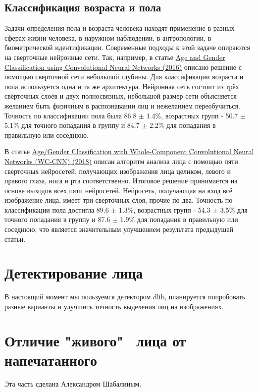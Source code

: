 \documentclass[a4paper,14pt]{extarticle}
\newcommand{\bibref}[3]{\hyperlink{#1}{#2 (#3)}} %
\begin{document}
    \subsection{Классификация возраста и пола}
    \par Задачи определения пола и возраста человека находят применение в разных сферах жизни человека, в наружном наблюдении, в антропологии, в биометрической идентификации. Современные подходы к этой задаче опираются на сверточные нейронные сети. Так, например, в статье \bibref{hassner}{Age and Gender Classification using Convolutional Neural Networks}{2016} описано решение с помощью сверточной сети небольшой глубины. Для классификации возраста и пола используется одна и та же архитектура. Нейронная сеть состоит из трёх свёрточных слоёв и двух полносвязных, небольшой размер сети объясняется желанием быть физичным в распознавании лиц и нежеланием переобучиться. Точность по классификации пола была 86.8 $\pm$ 1.4\%, возрастных групп - 50.7 $\pm$ 5.1\% для точного попадания в группу и 84.7 $\pm$ 2.2\% для попадания в правильную или соседнюю.
    \par В статье \bibref{INDIA}{Age/Gender Classification with Whole-Component Convolutional Neural Networks (WC-CNN)}{2018} описан алгоритм анализа лица с помощью пяти сверточных нейросетей, получающих изображения лица целиком, левого и правого глаза, носа и рта соответственно. Итоговое решение принимается на основе выходов всех пяти нейросетей. Нейросеть, получающая на вход всё изображение лица, имеет три сверточных слоя, прочие по два. Точность по классификации пола достигла 89.6 $\pm$ 1.3\%, возрастных групп - 54.3 $\pm$ 3.5\% для точного попадания в группу и 87.6 $\pm$ 1.9\% для попадания в правильную или соседнюю, что является значительным улучшением результата предыдущей статьи.
    \newpage

    \section{Детектирование лица}
    В настоящий момент мы пользуемся детектором dlib, планируется попробовать разные варианты и улучшить точность выделения лиц на изображениях.
    \newpage

    \section{Отличие "живого" \, лица от напечатанного}
    Эта часть сделана Александром Шабалиным.
\end{document}
